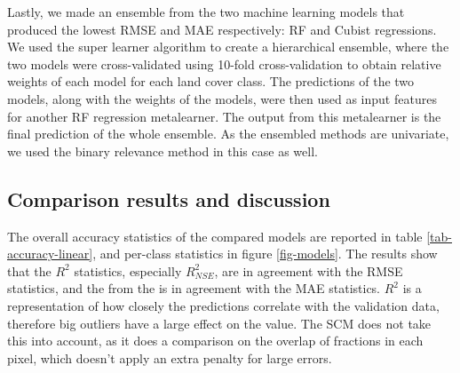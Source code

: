 \documentclass[review,authoryear,3p]{elsarticle}
\newcommand{\cran}[1]{CRAN:~#1}
\begin{document}

Lastly, we made an ensemble from the two machine learning models that produced the lowest \gls{RMSE} and \gls{MAE} respectively: \gls{RF} and Cubist regressions.
We used the super learner algorithm \citep{laan_super_2007} to create a hierarchical ensemble, where the two models were cross-validated using 10-fold cross-validation to obtain relative weights of each model for each land cover class.
The predictions of the two models, along with the weights of the models, were then used as input features for another \gls{RF} regression metalearner.
The output from this metalearner is the final prediction of the whole ensemble.
As the ensembled methods are univariate, we used the binary relevance method in this case as well.




\subsection{Comparison results and discussion}

The overall accuracy statistics of the compared models are reported in table \ref{tab-accuracy-linear}, and per-class statistics in figure \ref{fig-models}.
The results show that the $R^2$ statistics, especially $R^2_{NSE}$, are in agreement with the \gls{RMSE} statistics, and the  from the  is in agreement with the \gls{MAE} statistics.
$R^2$ is a representation of how closely the predictions correlate with the validation data, therefore big outliers have a large effect on the value.
The \gls{SCM} does not take this into account, as it does a comparison on the overlap of fractions in each pixel, which doesn't apply an extra penalty for large errors.
\end{document}
